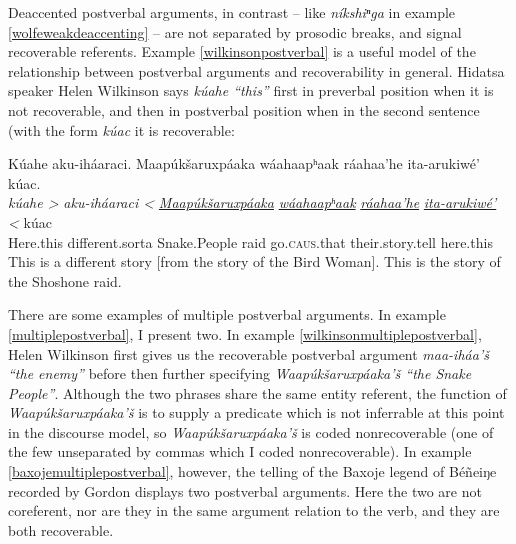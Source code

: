 \documentclass[output=paper]{LSP/langsci}
\begin{document}
Deaccented postverbal arguments, in contrast -- like \emph{níkshiⁿga} in example \ref{wolfeweakdeaccenting} -- are not separated by prosodic breaks, and signal recoverable referents. Example \ref{wilkinsonpostverbal} is a useful model of the relationship between postverbal arguments and recoverability in general. Hidatsa speaker Helen Wilkinson says \emph{kúahe “this”} first in preverbal position when it is not recoverable, and then in postverbal position when in the second sentence (with the form \emph{kúac} it is recoverable:

\ea\label{wilkinsonpostverbal}
Kúahe aku-iháaraci. Maapúkšaruxpáaka wáahaapʰaak ráahaa’he ita-arukiwé’ kúac.\footnotemark\\
\gll	\emph{kúahe >}	\emph{aku-iháaraci <}	\emph{\underline{Maapúkšaruxpáaka}} 	\emph{\underline{wáahaapʰaak}} 	\emph{\underline{ráahaa’he}}			\emph{\underline{ita-arukiwé’} <}		kúac\\
	Here.this 		different.sorta		Snake.People 					raid 						go.\textsc{caus}.that 				their.story.tell 					here.this\\
\glt	This is a different story [from the story of the Bird Woman]. This is the story of the Shoshone raid.
\z

There are some examples of multiple postverbal arguments. In example \ref{multiplepostverbal}, I present two. In example \ref{wilkinsonmultiplepostverbal}, Helen Wilkinson first gives us the recoverable postverbal argument \emph{maa-iháa’š “the enemy”} before then further specifying \emph{Waapúkšaruxpáaka’š “the Snake People”}. Although the two phrases share the same entity referent, the function of \emph{Waapúkšaruxpáaka’š} is to supply a predicate which is not inferrable at this point in the discourse model, so \emph{Waapúkšaruxpáaka’š} is coded nonrecoverable (one of the few unseparated by commas which I coded nonrecoverable). In example \ref{baxojemultiplepostverbal}, however, the telling of the Baxoje legend of Béñeiŋe recorded by Gordon \citet{Marsh1936} displays two postverbal arguments. Here the two are not coreferent, nor are they in the same argument relation to the verb, and they are both recoverable. 
\end{document}
